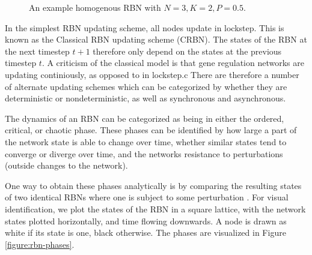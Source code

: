 \begin{figure}
  \centering
  \caption{An example homogenous RBN with $N=3, K=2, P=0.5$.}
  \label{figure:sample-homogenous-rbn}
\end{figure}

In the simplest RBN updating scheme, all nodes update in lockstep.
This is known as the Classical RBN updating scheme (CRBN).
The states of the RBN at the next timestep $t+1$ therefore only depend on the states at the previous timestep $t$.
A criticism of the classical model is that gene regulation networks are updating continiously,
as opposed to in lockstep.c
There are therefore a number of alternate updating schemes which can be categorized by whether they are deterministic or nondeterministic, as well as synchronous and asynchronous.

The dynamics of an RBN can be categorized as being in either the ordered, critical, or chaotic phase.
These phases can be identified by how large a part of the network state is able to change over time,
whether similar states tend to converge or diverge over time,
and the networks resistance to perturbations (outside changes to the network).

One way to obtain these phases analytically is by comparing the resulting states of two identical RBNs where one is subject to some perturbation \cite{gershenson2004introduction}.
For visual identification, we plot the states of the RBN in a square lattice,
with the network states plotted horizontally, and time flowing downwards.
A node is drawn as white if its state is one, black otherwise.
The phases are visualized in Figure \ref{figure:rbn-phases}.

